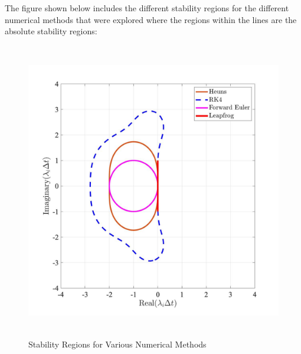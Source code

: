 \documentclass[conf]{new-aiaa}
\begin{document}
    The figure shown below includes the different stability regions for the different numerical methods that were explored where the regions within the lines are the absolute stability regions\cite{StabReg}:
    \begin{figure}[H]
        \centering
        \includegraphics[height = 13cm]{Figures/Stability/Stability.jpg}
        \caption{Stability Regions for Various Numerical Methods}
        \label{Stab}
    \end{figure}
  
\end{document}
